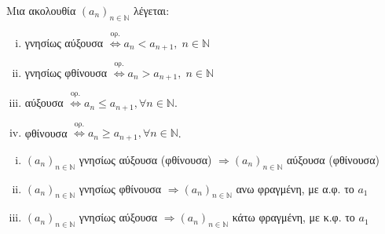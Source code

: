 \documentclass[main.tex]{subfiles}
\begin{document}
\begin{dfn}
    Μια ακολουθία $ (a_{n})_{n \in \mathbb{N}} $ λέγεται:
    \begin{enumerate}[i)]
        \item \textcolor{Col\thechapter}{γνησίως αύξουσα} 
            $ \overset{\text{ορ.}}{\Leftrightarrow} a_{n} 
            < a_{n+1}, \; n \in \mathbb{N}$
        \item \textcolor{Col\thechapter}{γνησίως φθίνουσα} 
            $ \overset{\text{ορ.}}{\Leftrightarrow} a_{n} 
            > a_{n+1}, \; n \in \mathbb{N}$
        \item \textcolor{Col\thechapter}{αύξουσα} 
            $ \overset{\text{ορ.}}{\Leftrightarrow} a_{n} \leq 
            a_{n+1}, \forall n \in \mathbb{N}  $.
        \item \textcolor{Col\thechapter}{φθίνουσα} 
            $ \overset{\text{ορ.}}{\Leftrightarrow} a_{n} \geq 
            a_{n+1}, \forall n \in \mathbb{N}  $.
    \end{enumerate}
\end{dfn}

\begin{rems}
\item {}
    \begin{enumerate}[i)]
        \item $ (a_{n})_{n \in \mathbb{N}} $ γνησίως αύξουσα (φθίνουσα) $ 
            \Rightarrow (a_{n})_{n \in \mathbb{N}} $ αύξουσα (φθίνουσα) 
        \item $ (a_{n})_{n \in \mathbb{N}} $ γνησίως φθίνουσα  $ 
            \Rightarrow (a_{n})_{n \in \mathbb{N}} $ ανω φραγμένη, με 
            α.φ. το $ a_{1} $  
        \item $ (a_{n})_{n \in \mathbb{N}} $ γνησίως αύξουσα  $ 
            \Rightarrow (a_{n})_{n \in \mathbb{N}} $ κάτω φραγμένη, με 
            κ.φ. το $ a_{1} $  
    \end{enumerate}
\end{rems}
\end{document}
